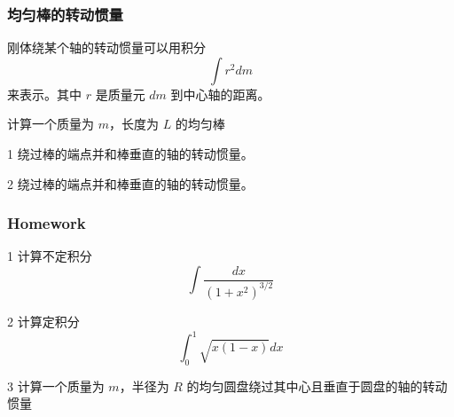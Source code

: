 \documentclass[CJK,13pt]{beamer}
\begin{document}




\begin{frame}
  \frametitle{均匀棒的转动惯量}
  刚体绕某个轴的转动惯量可以用积分
  $$\int r^2 dm $$
  来表示。其中 $r$ 是质量元 $dm$ 到中心轴的距离。

  
  计算一个质量为 $m$，长度为 $L$ 的均匀棒
  \bitem
\item[1]{绕过棒的端点并和棒垂直的轴的转动惯量。}
\item[2]{绕过棒的端点并和棒垂直的轴的转动惯量。}
  \eitem
\end{frame}

\begin{frame}
  \frametitle{Homework}
  \bitem
\item[1]{计算不定积分 $$\int \frac{dx}{\left(1+x^2\right)^{3/2}}$$}
\item[2]{计算定积分 $$\int_0^1 \sqrt{x(1-x)}dx$$}
\item[3]{计算一个质量为 $m$，半径为 $R$ 的均匀圆盘绕过其中心且垂直于圆盘的轴的转动惯量}
  \eitem
\end{frame}

\ech
\end{document}
